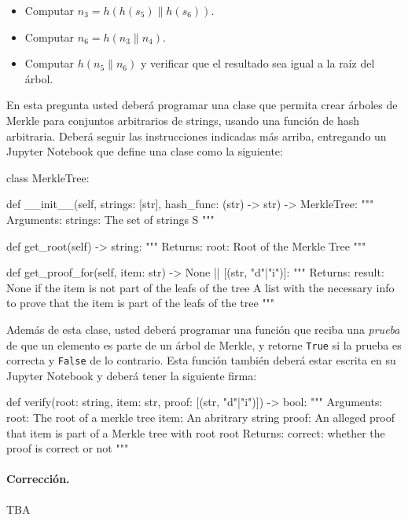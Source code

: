\begin{itemize}
  \item Computar $n_3=h(h(s_5)\|h(s_6))$.
  \item Computar $n_6=h(n_3\|n_4)$.
  \item Computar $h(n_5\|n_6)$ y verificar que el resultado sea igual a la raíz del árbol.
\end{itemize}

En esta pregunta usted deberá programar una clase que permita crear árboles de Merkle para conjuntos arbitrarios de strings, usando una función de hash arbitraria. Deberá seguir las instrucciones indicadas más arriba, entregando un Jupyter Notebook que define una clase como la siguiente:

\bigskip
\begin{python}
  class MerkleTree:
    
    def __init__(self, strings: [str], hash_func: (str) -> str) -> MerkleTree:
    """
    Arguments:
      strings: The set of strings S
    """

    def get_root(self) -> string:
    """
    Returns:
      root: Root of the Merkle Tree
    """

    def get_proof_for(self, item: str) -> None || [(str, "d"|"i")]:
    """
    Returns:
      result: None if the item is not part of the leafs of the tree
              A list with the necessary info to prove that the
              item is part of the leafs of the tree
    """
\end{python}

Además de esta clase, usted deberá programar una función que reciba una \emph{prueba} de que un elemento es parte de un árbol de Merkle, y retorne \texttt{True} si la prueba es correcta y \texttt{False} de lo contrario. Esta función también deberá estar escrita en su Jupyter Notebook y deberá tener la siguiente firma:

\bigskip
\begin{python}
  def verify(root: string, item: str, proof: [(str, "d"|"i")]) -> bool:
    """
    Arguments:
      root: The root of a merkle tree
      item: An abritrary string
      proof: An alleged proof that item is part of a Merkle
             tree with root root
    Returns:
      correct: whether the proof is correct or not
    """
\end{python}


\medskip

\paragraph{Corrección.} TBA


\medskip

